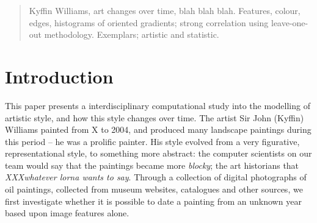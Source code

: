 \documentclass[conference,a4paper]{IEEEtran}
\begin{document}




\maketitle


\begin{abstract}
Kyffin Williams, art changes over time, blah blah blah. Features, colour, edges, histograms of oriented gradients; strong correlation using leave-one-out methodology.
Exemplars; artistic and statistic. 
\end{abstract}





%
\IEEEpeerreviewmaketitle



\section{Introduction}

This paper presents a interdisciplinary computational study into the modelling
of artistic style, and how this style changes over time. The artist Sir John
(Kyffin) Williams painted from X to 2004, and produced many landscape paintings
during this period -- he was a prolific painter. His style evolved from a very
figurative, representational style, to something more abstract: the computer
scientists on our team would say that the paintings became more \emph{blocky};
the art historians that \emph{XXXwhatever lorna wants to say}. Through a
collection of digital photographs of oil paintings, collected from museum
websites, catalogues and other sources, we first investigate whether it is
possible to date a painting from an unknown year based upon image features
alone.  
\end{document}
